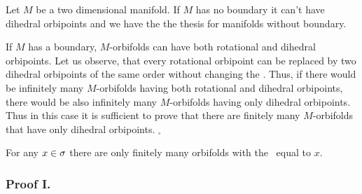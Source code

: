 Let $M$ be a two dimensional manifold. 
If $M$ has no boundary it can't have dihedral orbipoints and we have the the thesis for manifolds 
without boundary.

If $M$ has a boundary, $M$-orbifolds 
can have both rotational and dihedral orbipoints. 
Let us observe, that every rotational orbipoint can be replaced by two dihedral orbipoints 
of the same order without changing the \Eoc. Thus, if there would be infinitely many 
$M$-orbifolds having both rotational and dihedral orbipoints, there would be 
also infinitely many $M$-orbifolds having only dihedral orbipoints. 
Thus in this case it is sufficient to prove that there are finitely many $M$-orbifolds 
that have only dihedral orbipoints. $_\square$



\begin{theorem}\label{second_finiteness_theorem}
For any $x \in {\sigma}$ there are only finitely many orbifolds 
with the \Eoc\ equal to $x$.
\end{theorem}



\subsubsection{Proof I.} 

